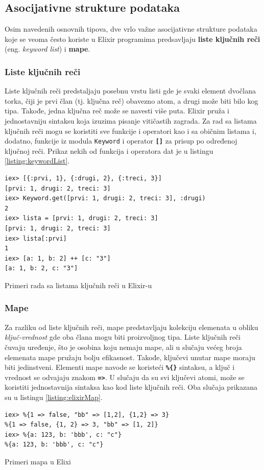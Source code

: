 \documentclass[12pt,oneside]{memoir}
\begin{document}
\subsection{Asocijativne strukture podataka}
Osim navedenih osnovnih tipova, dve vrlo važne asocijativne strukture podataka koje se 
veoma često koriste u Elixir programima predsavljaju \textbf{liste ključnih reči} (eng.
\emph{keyword list}) i \textbf{mape}.
\subsubsection{Liste ključnih reči}
Liste ključnih reči predstaljaju posebnu vrstu listi gde je svaki element dvočlana torka,
čiji je prvi član (tj. ključna reč) obavezno atom, a drugi može biti bilo kog tipa. Takođe,
jedna ključna reč može se navesti više puta. Elixir pruža i jednostavniju sintaksu koja izuzima
pisanje vitičastih zagrada. Za rad sa listama ključnih reči mogu se koristiti sve funkcije i
operatori kao i sa običnim listama i, dodatno, funkcije iz modula \texttt{Keyword} i operator
\texttt{\textbf{[\smallskip]}} za prisup po određenoj ključnoj reči. Prikaz nekih od funkcija i operatora
dat je u listingu \ref{listing:keywordList}.
\begin{listing}[!h]
\begin{verbatim}
iex> [{:prvi, 1}, {:drugi, 2}, {:treci, 3}]
[prvi: 1, drugi: 2, treci: 3]
iex> Keyword.get([prvi: 1, drugi: 2, treci: 3], :drugi)
2
iex> lista = [prvi: 1, drugi: 2, treci: 3]
[prvi: 1, drugi: 2, treci: 3]
iex> lista[:prvi]
1
iex> [a: 1, b: 2] ++ [c: "3"]
[a: 1, b: 2, c: "3"]
\end{verbatim}
\caption{Primeri rada sa listama ključnih reči u Elixir-u}
\label{listing:keywordList}
\end{listing}

\subsubsection{Mape}
Za razliku od liste ključnih reči, mape predstavljaju kolekciju elemenata u obliku
\emph{ključ-vrednost} gde oba člana mogu biti proizvoljnog tipa. Liste ključnih
reči čuvaju uređenje, što je osobina koju nemaju mape, ali u slučaju većeg broja elemenata
mape pružaju bolju efikasnost. Takođe, ključevi unutar mape moraju biti jedinstveni.
Elementi mape navode se koristeći \texttt{\textbf{\%\{\}}} sintaksu, a ključ i vrednost se
odvajaju znakom \texttt{\textbf{=>}}. U slučaju da su svi ključevi atomi, može se koristiti
jednostavnija sintaksa kao kod liste ključnih reči. Oba slučaja prikazana su u listingu 
\ref{listing:elixirMap}.
\begin{listing}[!h]
\begin{verbatim}
iex> %{1 => false, "bb" => [1,2], {1,2} => 3}
%{1 => false, {1, 2} => 3, "bb" => [1, 2]}
iex> %{a: 123, b: 'bbb', c: "c"}
%{a: 123, b: 'bbb', c: "c"}
\end{verbatim}
\caption{Primeri mapa u Elixi}
\label{listing:elixirMap}
\end{listing}
\end{document}
